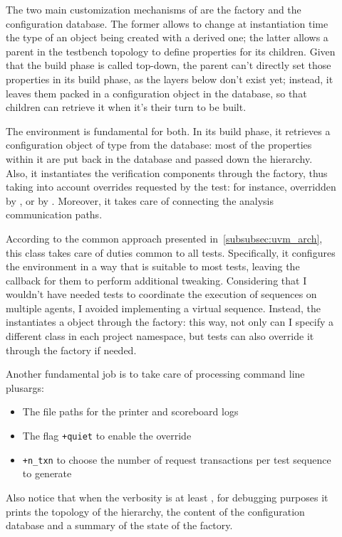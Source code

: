 \begin{description}
    \item[] The two main customization mechanisms of \uvm are the factory and the configuration database. The former allows to change at instantiation time the type of an object being created with a derived one; the latter allows a parent in the testbench topology to define properties for its children. Given that the build phase is called top-down, the parent can't directly set those properties in its build phase, as the layers below don't exist yet; instead, it leaves them packed in a configuration object in the database, so that children can retrieve it when it's their turn to be built.

    The environment is fundamental for both. In its build phase, it retrieves a configuration object of type  from the database: most of the properties within it are put back in the database and passed down the hierarchy. Also, it instantiates the verification components through the factory, thus taking into account overrides requested by the test: for instance,  overridden by , or  by . Moreover, it takes care of connecting the analysis communication paths.
    
    \item[] According to the common approach presented in~\cref{subsubsec:uvm_arch}, this class takes care of duties common to all tests. Specifically, it configures the environment in a way that is suitable to most tests, leaving the callback  for them to perform additional tweaking. Considering that I wouldn't have needed tests to coordinate the execution of sequences on multiple agents, I avoided implementing a virtual sequence. Instead, the  instantiates a  object through the factory: this way, not only can I specify a different  class in each project namespace, but tests can also override it through the factory if needed.
    
    Another fundamental job is to take care of processing command line plusargs:
    \begin{itemize}
        \item The file paths for the printer and scoreboard logs
        \item The flag \verb|+quiet| to enable the  override
        \item \verb|+n_txn| to choose the number of request transactions per test sequence to generate
    \end{itemize}

    Also notice that when the verbosity is at least , for debugging purposes it prints the topology of the hierarchy, the content of the configuration database and a summary of the state of the factory.
\end{description}

